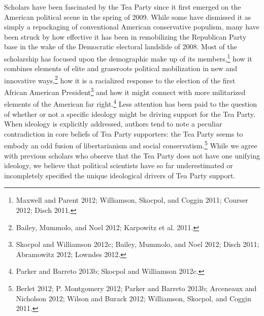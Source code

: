 \documentclass[12pt,]{article}
\begin{document}
Scholars have been fascinated by the Tea Party since it first emerged on
the American political scene in the spring of 2009. While some have
dismissed it as simply a repackaging of conventional American
conservative populism, many have been struck by how effective it has
been in remobilizing the Republican Party base in the wake of the
Democratic electoral landslide of 2008. Most of the scholarship has
focused upon the demographic make up of its members,\footnote{Maxwell
  and Parent 2012; Williamson, Skocpol, and Coggin 2011; Courser 2012;
  Disch 2011. } how it combines elements of elite and grassroots
political mobilization in new and innovative ways,\footnote{Bailey,
  Mummolo, and Noel 2012; Karpowitz et al. 2011. } how it is a
racialized response to the election of the first African American
President\footnote{Skocpol and Williamson 2012c; Bailey, Mummolo, and
  Noel 2012; Disch 2011; Abramowitz 2012; Lowndes 2012. } and how it
might connect with more militarized elements of the American far
right.\footnote{Parker and Barreto 2013b; Skocpol and Williamson 2012c. }
Less attention has been paid to the question of whether or not a
specific ideology might be driving support for the Tea Party. When
ideology is explicitly addressed, authors tend to note a peculiar
contradiction in core beliefs of Tea Party supporters: the Tea Party
seems to embody an odd fusion of libertarianism and social
conservatism.\footnote{Berlet 2012; P. Montgomery 2012; Parker and
  Barreto 2013b; Arceneaux and Nicholson 2012; Wilson and Burack 2012;
  Williamson, Skocpol, and Coggin 2011. } While we agree with previous
scholars who observe that the Tea Party does not have one unifying
ideology, we believe that political scientists have so far
underestimated or incompletely specified the unique ideological drivers
of Tea Party support.
\end{document}

